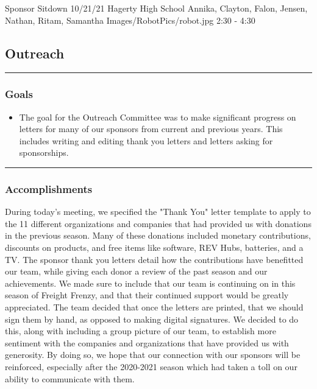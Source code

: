 \insertmeeting 
	{Sponsor Sitdown} 
	{10/21/21}
	{Hagerty High School}
	{Annika, Clayton, Falon, Jensen, Nathan, Ritam, Samantha}
	{Images/RobotPics/robot.jpg}
	{2:30 - 4:30}
	
\subsection*{Outreach}
\noindent\hfil\rule{\textwidth}{.4pt}\hfil
\subsubsection*{Goals}
\begin{itemize}
    \item The goal for the Outreach Committee was to make significant progress on letters for many of our sponsors from current and previous years. This includes writing and editing thank you letters and letters asking for sponsorships. 

\end{itemize} 

\noindent\hfil\rule{\textwidth}{.4pt}\hfil

\subsubsection*{Accomplishments}
During today's meeting, we specified the "Thank You" letter template to apply to the 11 different organizations and companies that had provided us with donations in the previous season. Many of these donations included monetary contributions, discounts on products, and free items like software, REV Hubs, batteries, and a TV. The sponsor thank you letters detail how the contributions have benefitted our team, while giving each donor a review of the past season and our achievements. We made sure to include that our team is continuing on in this season of Freight Frenzy, and that their continued support would be greatly appreciated. The team decided that once the letters are printed, that we should sign them by hand, as opposed to making digital signatures. We decided to do this, along with including a group picture of our team, to establish more sentiment with the companies and organizations that have provided us with generosity. By doing so, we hope that our connection with our sponsors will be reinforced, especially after the 2020-2021 season which had taken a toll on our ability to communicate with them.





